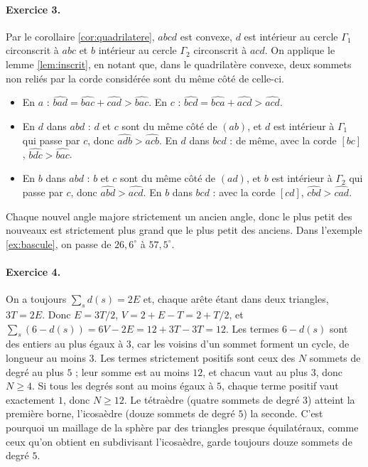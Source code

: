 \documentclass[11pt,a4paper]{article}
\theoremstyle{plain}
\theoremstyle{definition}
\theoremstyle{remark}
\begin{document}
\paragraph{Exercice 3.} Par le corollaire \ref{cor:quadrilatere}, $abcd$ est convexe, $d$ est intérieur au cercle $\Gamma_1$ circonscrit à $abc$ et $b$ intérieur au cercle $\Gamma_2$ circonscrit à $acd$. On applique le lemme \ref{lem:inscrit}, en notant que, dans le quadrilatère convexe, deux sommets non reliés par la corde considérée sont du même côté de celle-ci.
\begin{itemize}[nosep]
\item En $a$ : $\widehat{bad}=\widehat{bac}+\widehat{cad}>\widehat{bac}$. En $c$ : $\widehat{bcd}=\widehat{bca}+\widehat{acd}>\widehat{acd}$.
\item En $d$ dans $abd$ : $d$ et $c$ sont du même côté de $(ab)$, et $d$ est intérieur à $\Gamma_1$ qui passe par $c$, donc $\widehat{adb}>\widehat{acb}$. En $d$ dans $bcd$ : de même, avec la corde $[bc]$, $\widehat{bdc}>\widehat{bac}$.
\item En $b$ dans $abd$ : $b$ et $c$ sont du même côté de $(ad)$, et $b$ est intérieur à $\Gamma_2$ qui passe par $c$, donc $\widehat{abd}>\widehat{acd}$. En $b$ dans $bcd$ : avec la corde $[cd]$, $\widehat{cbd}>\widehat{cad}$.
\end{itemize}
Chaque nouvel angle majore strictement un ancien angle, donc le plus petit des nouveaux est strictement plus grand que le plus petit des anciens. Dans l'exemple \ref{ex:bascule}, on passe de $26{,}6^\circ$ à $57{,}5^\circ$.

\paragraph{Exercice 4.} On a toujours $\sum_sd(s)=2E$ et, chaque arête étant dans deux triangles, $3T=2E$. Donc $E=3T/2$, $V=2+E-T=2+T/2$, et $\sum_s(6-d(s))=6V-2E=12+3T-3T=12$. Les termes $6-d(s)$ sont des entiers au plus égaux à $3$, car les voisins d'un sommet forment un cycle, de longueur au moins $3$. Les termes strictement positifs sont ceux des $N$ sommets de degré au plus $5$ ; leur somme est au moins $12$, et chacun vaut au plus $3$, donc $N\geq4$. Si tous les degrés sont au moins égaux à $5$, chaque terme positif vaut exactement $1$, donc $N\geq12$. Le tétraèdre (quatre sommets de degré $3$) atteint la première borne, l'icosaèdre (douze sommets de degré $5$) la seconde. C'est pourquoi un maillage de la sphère par des triangles presque équilatéraux, comme ceux qu'on obtient en subdivisant l'icosaèdre, garde toujours douze sommets de degré $5$.
\end{document}
